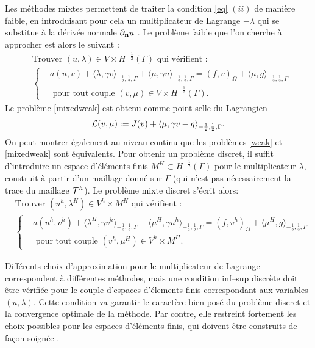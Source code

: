 \documentclass[11pt]{book}
\def\n{{\bf n}}
\newcommand{\caL}{{\cal L}}
\newcommand{\caT}{{\cal T}}
\newcommand{\dnu}{\partial_{\n} u}
\begin{document}
Les méthodes mixtes permettent de traiter la condition \eqref{eq} $(ii)$ de manière faible, en introduisant pour cela un multiplicateur de Lagrange $- \lambda$ qui se substitue à la dérivée normale $\dnu$ \cite{babuska-73a,brezzi-74,pitkaranta-79,pitkaranta-80}. 
Le problème faible que l'on cherche à approcher est alors le suivant :
\begin{align} 
\label{mixedweak}
&\textrm{Trouver } (u,\lambda)\in V \times H^{-\frac12}(\Gamma) \textrm{ qui vérifient :}\nonumber\\
&\left\{
\begin{aligned}
&a(u,v) + \langle \lambda , \gamma v \rangle_{-\frac12,\frac12,\Gamma}
+ \langle \mu , \gamma u \rangle_{-\frac12,\frac12,\Gamma} 
 = (f,v)_\Omega  + \langle \mu , g \rangle_{-\frac12,\frac12,\Gamma}\\ 
 &\textrm{ pour tout couple } (v,\mu) \in V \times H^{-\frac12}(\Gamma).
\end{aligned}
\right.
\end{align}
Le problème \eqref{mixedweak} est obtenu comme point-selle du Lagrangien 
\[
\caL ( v , \mu ) := J(v) +  \langle \mu , \gamma v - g \rangle_{-\frac12,\frac12,\Gamma}.
\]
On peut montrer également au niveau continu que les problèmes \eqref{weak} et \eqref{mixedweak} sont équivalents.
Pour obtenir un problème discret, il suffit d'introduire un espace d'éléments finis $M^H \subset H^{-\frac12} (\Gamma)$ pour le multiplicateur $\lambda$, construit à partir d'un maillage donné sur $\Gamma$ (qui n'est pas nécessairement la trace du maillage $\caT^h$). Le problème mixte discret s'écrit alors:
\begin{align} 
\label{mixedweakh}
&\textrm{Trouver } (u^h,\lambda^H)\in V^h \times M^H \textrm{ qui vérifient :}\nonumber\\
&\left\{
\begin{aligned}
&a(u^h,v^h) + \langle \lambda^H , \gamma v^h \rangle_{-\frac12,\frac12,\Gamma}
+ \langle \mu^H , \gamma u^h \rangle_{-\frac12,\frac12,\Gamma} 
 = (f,v^h)_\Omega  + \langle \mu^H , g \rangle_{-\frac12,\frac12,\Gamma}\\ 
 &\textrm{ pour tout couple } (v^h,\mu^H) \in V^h \times M^H.
\end{aligned}
\right.
\end{align}

Différents choix d'approximation pour le multiplicateur de Lagrange correspondent à différentes méthodes, mais une condition inf--sup discrète doit être vérifiée pour le couple d'espaces d'élements finis correspondant aux variables $(u,\lambda)$. Cette condition va garantir le caractère bien posé du problème discret et la convergence optimale de la méthode.
Par contre, elle restreint fortement les choix possibles pour les espaces d'éléments finis, qui doivent être construits de façon soignée \cite{stenberg-95}.
\end{document}
